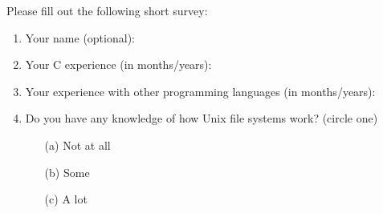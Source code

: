 \documentclass{article}
\title{}
\author{Debugging experiment - Entry Survey}
\date{July 30, 2003}
\begin{document}
\maketitle
\begin{flushleft}

\thispagestyle{empty}

\vspace{0.8in}

Please fill out the following short survey:

\begin{enumerate}
\item{Your name (optional):}
\item{Your C experience (in months/years):}
\item{Your experience with other programming languages (in months/years):}
\item{Do you have any knowledge of how Unix file systems work? (circle one)
        \begin{itemize}
           \item[(a)] {Not at all}
           \item[(b)] {Some}
           \item[(c)] {A lot}
        \end{itemize} }
\end{enumerate}


\end{flushleft}
\end{document}
